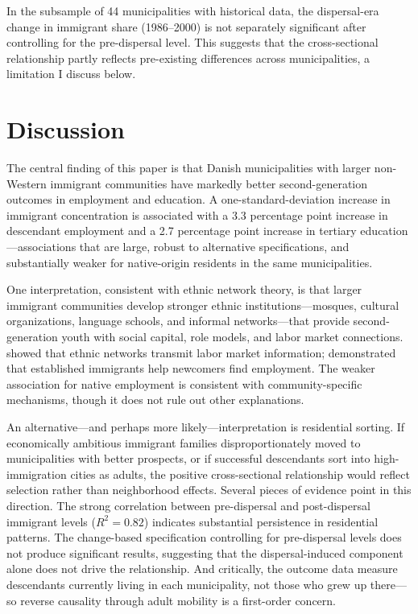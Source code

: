 \documentclass[12pt]{article}
\begin{document}
In the subsample of 44 municipalities with historical data, the dispersal-era change in immigrant share (1986--2000) is not separately significant after controlling for the pre-dispersal level. This suggests that the cross-sectional relationship partly reflects pre-existing differences across municipalities, a limitation I discuss below.

\section{Discussion}

The central finding of this paper is that Danish municipalities with larger non-Western immigrant communities have markedly better second-generation outcomes in employment and education. A one-standard-deviation increase in immigrant concentration is associated with a 3.3 percentage point increase in descendant employment and a 2.7 percentage point increase in tertiary education---associations that are large, robust to alternative specifications, and substantially weaker for native-origin residents in the same municipalities.

One interpretation, consistent with ethnic network theory, is that larger immigrant communities develop stronger ethnic institutions---mosques, cultural organizations, language schools, and informal networks---that provide second-generation youth with social capital, role models, and labor market connections. \citet{munshi2003} showed that ethnic networks transmit labor market information; \citet{beaman2012} demonstrated that established immigrants help newcomers find employment. The weaker association for native employment is consistent with community-specific mechanisms, though it does not rule out other explanations.

An alternative---and perhaps more likely---interpretation is residential sorting. If economically ambitious immigrant families disproportionately moved to municipalities with better prospects, or if successful descendants sort into high-immigration cities as adults, the positive cross-sectional relationship would reflect selection rather than neighborhood effects. Several pieces of evidence point in this direction. The strong correlation between pre-dispersal and post-dispersal immigrant levels ($R^2 = 0.82$) indicates substantial persistence in residential patterns. The change-based specification controlling for pre-dispersal levels does not produce significant results, suggesting that the dispersal-induced component alone does not drive the relationship. And critically, the outcome data measure descendants currently living in each municipality, not those who grew up there---so reverse causality through adult mobility is a first-order concern.
\end{document}

